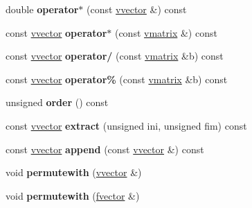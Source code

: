 \begin{DoxyCompactItemize}
\item 
double {\bfseries operator$\ast$} (const \hyperlink{classvvector}{vvector} \&) const \hypertarget{classvvector_abdc759d85565e791bead5f887c974a9c}{}\label{classvvector_abdc759d85565e791bead5f887c974a9c}

\item 
const \hyperlink{classvvector}{vvector} {\bfseries operator$\ast$} (const \hyperlink{classvmatrix}{vmatrix} \&) const \hypertarget{classvvector_a631532fa6198ea1188d69d4cae36e65a}{}\label{classvvector_a631532fa6198ea1188d69d4cae36e65a}

\item 
const \hyperlink{classvvector}{vvector} {\bfseries operator/} (const \hyperlink{classvmatrix}{vmatrix} \&b) const \hypertarget{classvvector_a501d0b672d0e126a2d12294d9a9e6e15}{}\label{classvvector_a501d0b672d0e126a2d12294d9a9e6e15}

\item 
const \hyperlink{classvvector}{vvector} {\bfseries operator\%} (const \hyperlink{classvmatrix}{vmatrix} \&b) const \hypertarget{classvvector_a0e4e06f7528233a07a56fc3ea834d965}{}\label{classvvector_a0e4e06f7528233a07a56fc3ea834d965}

\item 
unsigned {\bfseries order} () const \hypertarget{classvvector_a5f38124089c930e12b8317a9ac30e71b}{}\label{classvvector_a5f38124089c930e12b8317a9ac30e71b}

\item 
const \hyperlink{classvvector}{vvector} {\bfseries extract} (unsigned ini, unsigned fim) const \hypertarget{classvvector_ac93f75f227760c9f55610aba8ad8a81d}{}\label{classvvector_ac93f75f227760c9f55610aba8ad8a81d}

\item 
const \hyperlink{classvvector}{vvector} {\bfseries append} (const \hyperlink{classvvector}{vvector} \&) const \hypertarget{classvvector_a883bab53c8b1eb237e9c87d0089973bc}{}\label{classvvector_a883bab53c8b1eb237e9c87d0089973bc}

\item 
void {\bfseries permutewith} (\hyperlink{classvvector}{vvector} \&)\hypertarget{classvvector_a207862a17fd16c7e6b62daef28d3fb35}{}\label{classvvector_a207862a17fd16c7e6b62daef28d3fb35}

\item 
void {\bfseries permutewith} (\hyperlink{classfvector}{fvector} \&)\hypertarget{classvvector_ae994f3adc0679a8e55c8e81390f5785a}{}\label{classvvector_ae994f3adc0679a8e55c8e81390f5785a}


\end{DoxyCompactItemize}
